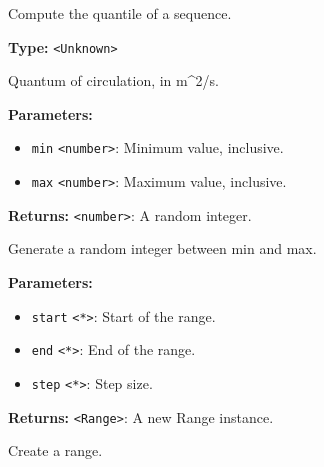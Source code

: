 \documentclass[12pt,a4paper]{article}
\begin{document}
\noindent Compute the quantile of a sequence.

\vspace{5mm}
\noindent {}\vspace{4mm}


\noindent \textbf{Type:} \texttt{<Unknown>}

\noindent Quantum of circulation, in m\textasciicircum{}2/s.

\vspace{5mm}
\noindent {}


\noindent \textbf{Parameters:}
\begin{itemize}
  \item \texttt{min} \texttt{<number>}: Minimum value, inclusive.
  \item \texttt{max} \texttt{<number>}: Maximum value, inclusive.
\end{itemize}

\noindent \textbf{Returns:} \texttt{<number>}: A random integer.

\noindent Generate a random integer between min and max.

\vspace{5mm}
\noindent {}


\noindent \textbf{Parameters:}
\begin{itemize}
  \item \texttt{start} \texttt{<*>}: Start of the range.
  \item \texttt{end} \texttt{<*>}: End of the range.
  \item \texttt{step} \texttt{<*>}: Step size.
\end{itemize}

\noindent \textbf{Returns:} \texttt{<Range>}: A new Range instance.

\noindent Create a range.

\vspace{5mm}
\noindent {}
\end{document}
